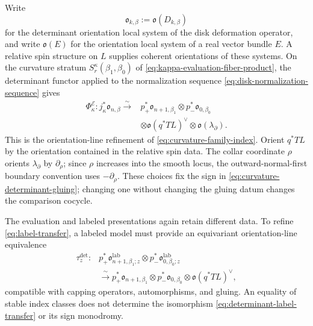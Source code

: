 \documentclass[11pt,letterpaper,twoside]{article}
\theoremstyle{plain}
\theoremstyle{definition}
\theoremstyle{remark}
\begin{document}
Write
\[
 \mathfrak o_{k,\beta}:=\mathfrak o(D_{k,\beta})
\]
for the determinant orientation local system of the disk deformation operator, and write $\mathfrak o(E)$ for the orientation local system of a real vector bundle $E$.  A relative spin structure on $L$ supplies coherent orientations of these systems.  On the curvature stratum $S^\kappa_r(\beta_1,\beta_0)$ of \eqref{eq:kappa-evaluation-fiber-product}, the determinant functor applied to the normalization sequence \eqref{eq:disk-normalization-sequence} gives
\begin{equation}\label{eq:curvature-determinant-gluing}
\begin{aligned}
 \Phi^\mathcal E_\kappa:
 j_\kappa^*\mathfrak o_{n,\beta}
 \xrightarrow{\ \sim\ }{}
 &p_+^*\mathfrak o_{n+1,\beta_1}
 \otimes p_-^*\mathfrak o_{0,\beta_0}\\
 &\otimes\mathfrak o(q^*TL)^\vee
 \otimes\mathfrak o(\lambda_\partial).
\end{aligned}
\end{equation}
This is the orientation-line refinement of \eqref{eq:curvature-family-index}.  Orient $q^*TL$ by the orientation contained in the relative spin data.  The collar coordinate $\rho$ orients $\lambda_\partial$ by $\partial_\rho$; since $\rho$ increases into the smooth locus, the outward-normal-first boundary convention uses $-\partial_\rho$.  These choices fix the sign in \eqref{eq:curvature-determinant-gluing}; changing one without changing the gluing datum changes the comparison cocycle.

The evaluation and labeled presentations again retain different data.  To refine \eqref{eq:label-transfer}, a labeled model must provide an equivariant orientation-line equivalence
\begin{equation}\label{eq:determinant-label-transfer}
\begin{aligned}
 \tau_z^{\det}:{}
 &p_+^*\mathfrak o^{\mathrm{lab}}_{n+1,\beta_1;z}
 \otimes p_-^*\mathfrak o^{\mathrm{lab}}_{0,\beta_0;z}\\
 &\xrightarrow{\ \sim\ }{}
 p_+^*\mathfrak o_{n+1,\beta_1}
 \otimes p_-^*\mathfrak o_{0,\beta_0}
 \otimes\mathfrak o(q^*TL)^\vee,
\end{aligned}
\end{equation}
compatible with capping operators, automorphisms, and gluing.  An equality of stable index classes does not determine the isomorphism \eqref{eq:determinant-label-transfer} or its sign monodromy.
\end{document}
